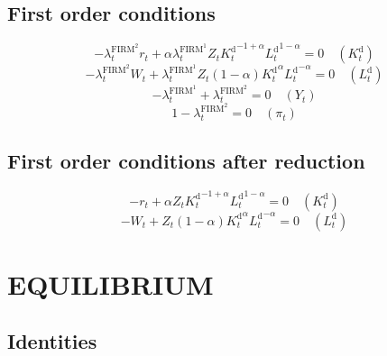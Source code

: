 \subsection{First order conditions}

\begin{equation}
-{\lambda^{\mathrm{FIRM}^{\mathrm{2}}}_{t}} {r_{t}} + {\alpha} {\lambda^{\mathrm{FIRM}^{\mathrm{1}}}_{t}} {Z_{t}} {{K^{\mathrm{d}}_{t}}^{-1 + \alpha}} {{L^{\mathrm{d}}_{t}}^{1 - \alpha}} = 0
 \quad \left(K^{\mathrm{d}}_{t}\right)
\end{equation}
\begin{equation}
-{\lambda^{\mathrm{FIRM}^{\mathrm{2}}}_{t}} {W_{t}} + {\lambda^{\mathrm{FIRM}^{\mathrm{1}}}_{t}} {Z_{t}} \left(1 - \alpha\right) {{K^{\mathrm{d}}_{t}}^{\alpha}} {{L^{\mathrm{d}}_{t}}^{-\alpha}} = 0
 \quad \left(L^{\mathrm{d}}_{t}\right)
\end{equation}
\begin{equation}
-\lambda^{\mathrm{FIRM}^{\mathrm{1}}}_{t} + \lambda^{\mathrm{FIRM}^{\mathrm{2}}}_{t} = 0
 \quad \left(Y_{t}\right)
\end{equation}
\begin{equation}
1 - \lambda^{\mathrm{FIRM}^{\mathrm{2}}}_{t} = 0
 \quad \left(\pi_{t}\right)
\end{equation}


\subsection{First order conditions after reduction}

\begin{equation}
-r_{t} + {\alpha} {Z_{t}} {{K^{\mathrm{d}}_{t}}^{-1 + \alpha}} {{L^{\mathrm{d}}_{t}}^{1 - \alpha}} = 0
 \quad \left(K^{\mathrm{d}}_{t}\right)
\end{equation}
\begin{equation}
-W_{t} + {Z_{t}} \left(1 - \alpha\right) {{K^{\mathrm{d}}_{t}}^{\alpha}} {{L^{\mathrm{d}}_{t}}^{-\alpha}} = 0
 \quad \left(L^{\mathrm{d}}_{t}\right)
\end{equation}




\section{EQUILIBRIUM}

\subsection{Identities}

